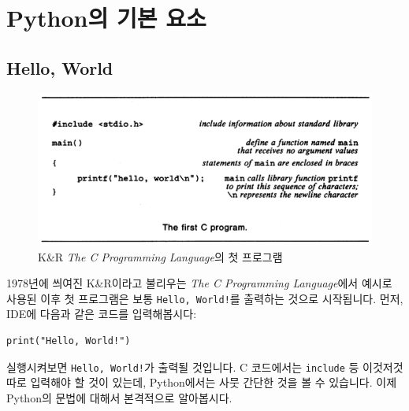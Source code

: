 \documentclass[../main.tex]{subfiles}
\begin{document}
\section{Python의 기본 요소}
\subsection{Hello, World}

\begin{figure}[htpb]
  \centering
  \includegraphics[width=0.8\linewidth]{./figures/hello_world.png}
  \caption*{K\&R \textit{The C Programming Language}의 첫 프로그램}
\end{figure}

1978년에 씌여진 K\&R이라고 불리우는 \textit{The C Programming Language}에서 예시로 사용된 이후 첫 프로그램은 보통 \texttt{Hello, World!}를 출력하는 것으로 시작됩니다.
먼저, IDE에 다음과 같은 코드를 입력해봅시다:
\begin{verbatim}
print("Hello, World!")
\end{verbatim}
실행시켜보면 \texttt{Hello, World!}가 출력될 것입니다.
C 코드에서는 \texttt{include} 등 이것저것 따로 입력해야 할 것이 있는데, Python에서는 사뭇 간단한 것을 볼 수 있습니다.
이제 Python의 문법에 대해서 본격적으로 알아봅시다.
\end{document}
